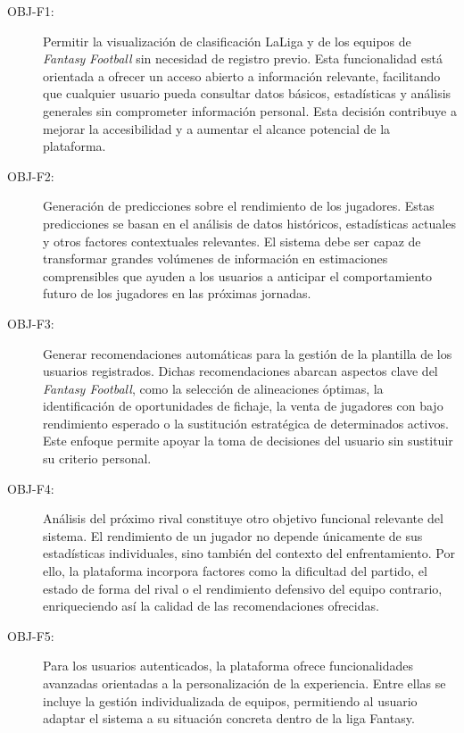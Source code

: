 \begin{description}
\item[OBJ-F1:] Permitir la visualización de clasificación LaLiga y de los equipos de \textit{Fantasy} 
\textit{Football} sin necesidad de registro previo. Esta funcionalidad está orientada a ofrecer un 
acceso abierto a información relevante, facilitando que cualquier usuario pueda consultar 
datos básicos, estadísticas y análisis generales sin comprometer información personal. Esta 
decisión contribuye a mejorar la accesibilidad y a aumentar el alcance potencial de la 
plataforma.

\item[OBJ-F2:] Generación de predicciones sobre el rendimiento de los jugadores. Estas predicciones 
se basan en el análisis de datos históricos, estadísticas actuales y otros factores 
contextuales relevantes. El sistema debe ser capaz de transformar grandes volúmenes de 
información en estimaciones comprensibles que ayuden a los usuarios a anticipar el 
comportamiento futuro de los jugadores en las próximas jornadas.

\item[OBJ-F3:] Generar recomendaciones automáticas para la gestión de la plantilla de los usuarios 
registrados. Dichas recomendaciones abarcan aspectos clave del \textit{Fantasy Football}, como la 
selección de alineaciones óptimas, la identificación de oportunidades de fichaje, la venta 
de jugadores con bajo rendimiento esperado o la sustitución estratégica de determinados 
activos. Este enfoque permite apoyar la toma de decisiones del usuario sin sustituir su 
criterio personal.

\item[OBJ-F4:] Análisis del próximo rival constituye otro objetivo funcional relevante del sistema. 
El rendimiento de un jugador no depende únicamente de sus estadísticas individuales, sino 
también del contexto del enfrentamiento. Por ello, la plataforma incorpora factores como la 
dificultad del partido, el estado de forma del rival o el rendimiento defensivo del equipo 
contrario, enriqueciendo así la calidad de las recomendaciones ofrecidas.

\item[OBJ-F5:] Para los usuarios autenticados, la plataforma ofrece funcionalidades avanzadas 
orientadas a la personalización de la experiencia. Entre ellas se incluye la gestión 
individualizada de equipos, permitiendo al usuario adaptar el sistema a su situación concreta 
dentro de la liga Fantasy.


\end{description}
